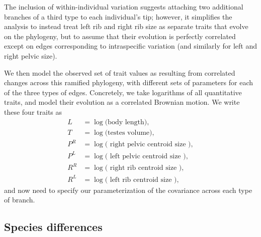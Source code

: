 \documentclass{article}
\begin{document}
The inclusion of within-individual variation suggests attaching two additional branches of a third type
to each individual's tip;
however, it simplifies the analysis to instead treat left rib and right rib size 
as separate traits that evolve on the phylogeny,
but to assume that their evolution is perfectly correlated except on edges corresponding to intraspecific variation
(and similarly for left and right pelvic size).


We then model the observed set of trait values as resulting from correlated changes across this ramified phylogeny,
with different sets of parameters for each of the three types of edges.
Concretely, we take logarithms of all quantitative traits,
and model their evolution as a correlated Brownian motion.
We write these four traits as
\begin{align}
    L &= \log \text{(body length)}, \\
    T &= \log \text{(testes volume)}, \\
    P^R &= \log \text{( right pelvic centroid size )}, \\
    P^L &= \log \text{( left pelvic centroid size )}, \\
    R^R &= \log \text{( right rib centroid size )}, \\
    R^L &= \log \text{( left rib centroid size )},
\end{align}
and now need to specify our parameterization of the covariance across each type of branch.

\subsection{Species differences}
\end{document}

